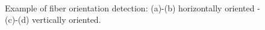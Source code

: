 \graphicspath{ {./Figure/Figure12/}}
\begin{figure}
  \centering

  \hspace*{\fill}
   \hfill
  \hspace*{\fill} \\ \hspace*{\fill}
   \hfill
  \hspace*{\fill}
	
	\caption{Example of fiber orientation detection: (a)-(b) horizontally oriented - (c)-(d)
		vertically oriented.}
		\label{fig:10}
		\end{figure}
